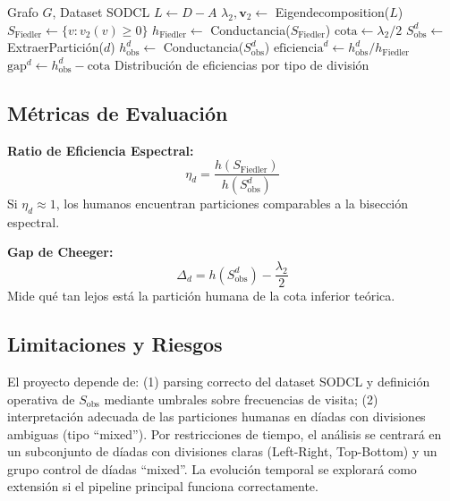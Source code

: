 \documentclass[conference]{IEEEtran}
\begin{document}
\begin{algorithm}
\caption{Análisis de Eficiencia Espectral}
\begin{algorithmic}[1]
\REQUIRE Grafo $G$, Dataset SODCL
\STATE $L \leftarrow D - A$ 
\STATE $\lambda_2, \mathbf{v}_2 \leftarrow$ Eigendecomposition($L$)
\STATE $S_{\text{Fiedler}} \leftarrow \{v : v_2(v) \geq 0\}$
\STATE $h_{\text{Fiedler}} \leftarrow$ Conductancia($S_{\text{Fiedler}}$)
\STATE $\text{cota} \leftarrow \lambda_2 / 2$
    \STATE $S_{\text{obs}}^d \leftarrow$ ExtraerPartición($d$)
    \STATE $h_{\text{obs}}^d \leftarrow$ Conductancia($S_{\text{obs}}^d$)
    \STATE $\text{eficiencia}^d \leftarrow h_{\text{obs}}^d / h_{\text{Fiedler}}$
    \STATE $\text{gap}^d \leftarrow h_{\text{obs}}^d - \text{cota}$
\ENDFOR
\RETURN Distribución de eficiencias por tipo de división
\end{algorithmic}
\end{algorithm}

\subsection{Métricas de Evaluación}

\textbf{Ratio de Eficiencia Espectral:}
\begin{equation}
\eta_d = \frac{h(S_{\text{Fiedler}})}{h(S_{\text{obs}}^d)}
\end{equation}
Si $\eta_d \approx 1$, los humanos encuentran particiones comparables a la bisección espectral.

\textbf{Gap de Cheeger:}
\begin{equation}
\Delta_d = h(S_{\text{obs}}^d) - \frac{\lambda_2}{2}
\end{equation}
Mide qué tan lejos está la partición humana de la cota inferior teórica.

\subsection{Limitaciones y Riesgos}

El proyecto depende de: (1) parsing correcto del dataset SODCL y definición operativa de $S_{\text{obs}}$ mediante umbrales sobre frecuencias de visita; (2) interpretación adecuada de las particiones humanas en díadas con divisiones ambiguas (tipo ``mixed''). Por restricciones de tiempo, el análisis se centrará en un subconjunto de díadas con divisiones claras (Left-Right, Top-Bottom) y un grupo control de díadas ``mixed''. La evolución temporal se explorará como extensión si el pipeline principal funciona correctamente.
\end{document}
